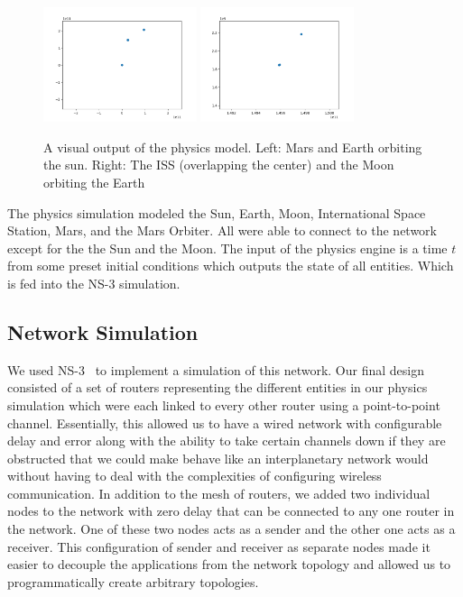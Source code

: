 \documentclass[a4paper,12pt]{article}
\begin{document}
\begin{figure}[h]
  \centering
  \includegraphics[width=0.4\textwidth]{media/sun_orbit.png}
  \includegraphics[width=0.4\textwidth]{media/moon_orbit.png}
  \caption{A visual output of the physics model. Left: Mars and Earth orbiting the sun. Right: The ISS (overlapping the center) and the Moon orbiting the Earth}
\end{figure}

The physics simulation modeled the Sun, Earth, Moon, International Space Station,
Mars, and the Mars Orbiter. All were able to connect to the network except for the 
the Sun and the Moon. The input of the physics engine is a time $t$ from some preset initial conditions
which outputs the state of all entities. Which is fed into the NS-3 simulation.

\subsection{Network Simulation}

We used NS-3~\cite{ns-3} to implement a simulation of this network. Our final
design consisted of a set of routers representing the different entities in our
physics simulation which were each linked to every other router using a
point-to-point channel. Essentially, this allowed us to have a wired network
with configurable delay and error along with the ability to take certain
channels down if they are obstructed that we could make behave like an
interplanetary network would without having to deal with the complexities of
configuring wireless communication. In addition to the mesh of routers, we added
two individual nodes to the network with zero delay that can be connected to any
one router in the network. One of these two nodes acts as a sender and the other
one acts as a receiver. This configuration of sender and receiver as separate
nodes made it easier to decouple the applications from the network topology and
allowed us to programmatically create arbitrary topologies.
\end{document}
